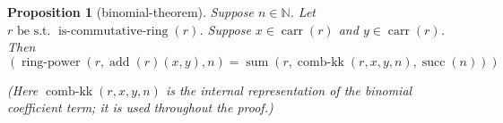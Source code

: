 \documentclass[11pt]{article}
\theoremstyle{plain}
\newtheorem{proposition}{Proposition}
\begin{document}
\begin{proposition}[binomial-theorem]
Suppose $n \in \mathbb{N}$. Let $r \text{ be s.t. } \operatorname{is\text{-}commutative\text{-}ring}(r)$. Suppose $x \in \operatorname{carr}(r)$ and $y \in \operatorname{carr}(r)$. Then
\begin{equation*}
(\operatorname{ring\text{-}power}(r, \operatorname{add}(r)(x, y), n) = \operatorname{sum}(r, \operatorname{comb\text{-}kk}(r, x, y, n), \operatorname{succ}(n)))
\end{equation*}


\noindent\emph{(Here $\operatorname{comb\text{-}kk}(r, x, y, n)$ is the internal representation of the binomial coefficient term; it is used throughout the proof.)}

\end{proposition}
\end{document}
